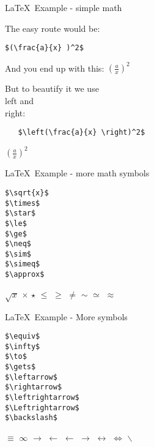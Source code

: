 \begin{frame}[t,fragile]{\LaTeX\ Example - simple math}


The easy route would be:
\begin{lstlisting}
$(\frac{a}{x} )^2$
\end{lstlisting}

And you end up with this: $(\frac{a}{x} )^2$

But to beautify it we use \\left and \\right:

  \begin{lstlisting}
   $\left(\frac{a}{x} \right)^2$
  \end{lstlisting}
   $\left(\frac{a}{x} \right)^2$

\end{frame}

\begin{frame}[t,fragile]{\LaTeX\ Example - more math symbols}


  \begin{lstlisting}
$\sqrt{x}$
$\times$
$\star$
$\le$
$\ge$
$\neq$
$\sim$
$\simeq$
$\approx$
  \end{lstlisting}

$\sqrt{x}$
$\times$
$\star$
$\le$
$\ge$
$\neq$
$\sim$
$\simeq$
$\approx$
\end{frame}

\begin{frame}[t,fragile]{\LaTeX\ Example - More symbols}
  \begin{lstlisting}
$\equiv$
$\infty$
$\to$
$\gets$
$\leftarrow$
$\rightarrow$
$\leftrightarrow$
$\Leftrightarrow$
$\backslash$
  \end{lstlisting}

$\equiv$
$\infty$
$\to$
$\gets$
$\leftarrow$
$\rightarrow$
$\leftrightarrow$
$\Leftrightarrow$
$\backslash$

\end{frame}

